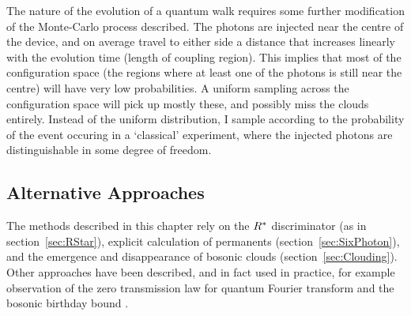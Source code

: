 The nature of the evolution of a quantum walk requires some further modification
of the Monte-Carlo process described. The photons are injected near the centre
of the device, and on average travel to either side a distance that increases
linearly with the evolution time (length of coupling region). This implies that
most of the configuration space (the regions where at least one of the photons
is still near the centre) will have very low probabilities. A uniform sampling
across the configuration space will pick up mostly these, and possibly miss the
clouds entirely. Instead of the uniform distribution, I sample according to the
probability of the event occuring in a `classical' experiment, where the
injected photons are distinguishable in some degree of freedom.

\subsection{Alternative Approaches}
\label{sec:QCVAlternatives}
The methods described in this chapter rely on the \(R^{*}\) discriminator (as
in section~\ref{sec:RStar}), explicit calculation of permanents
(section~\ref{sec:SixPhoton}), and the emergence and disappearance of bosonic
clouds (section~\ref{sec:Clouding}). Other approaches have been described, and
in fact used in practice, for example observation of the zero transmission law
for quantum Fourier transform \cite{ztl, tichy-verification} and the bosonic
birthday bound \cite{birthdays, experimental-birthdays}.

